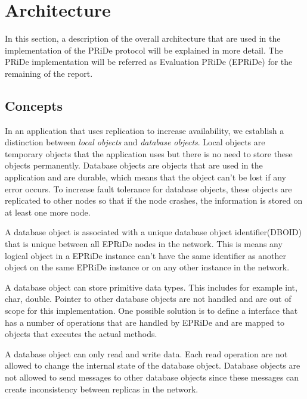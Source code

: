 
\section{Architecture} %
\label{sec:arch}

In this section, a description of the overall architecture that are used in the implementation of the PRiDe protocol will be explained in more detail. The PRiDe implementation will be referred as Evaluation PRiDe (EPRiDe) for the remaining of the report.  


\subsection{Concepts} %
\label{sub:consepts}

In an application that uses replication to increase availability, we establish a distinction between \emph{local objects} and \emph{database objects}. Local objects are temporary objects that the application uses but there is no need to store these objects permanently. Database objects are objects that are used in the application and are durable, which means that the object can't be lost if any error occurs. To increase fault tolerance for database objects, these objects are replicated to other nodes so that if the node crashes, the information is stored on at least one more node. 

A database object is associated with a unique database object identifier(DBOID) that is unique between all EPRiDe nodes in the network. This is means any logical object in a EPRiDe instance can't have the same identifier as another object on the same EPRiDe instance or on any other instance in the network.    

A database object can store primitive data types. This includes for example int, char, double. Pointer to other database objects are not handled and are out of scope for this implementation. One possible solution is to define a interface that has a number of operations that are handled by EPRiDe and are mapped to objects that executes the actual methods.  

A database object can only read and write data. Each read operation are not allowed to change the internal state of the database object. Database objects are not allowed to send messages to other database objects since these messages can create inconsistency between replicas in the network.


